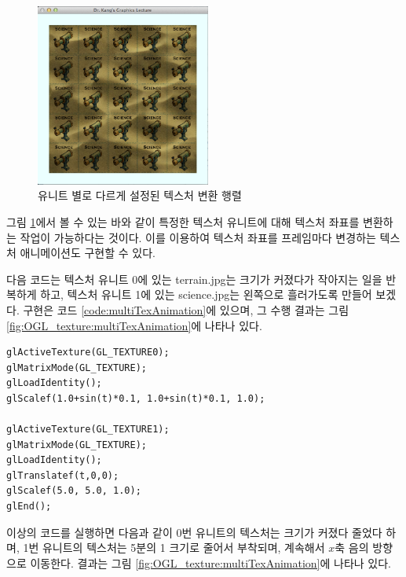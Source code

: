 \begin{figure}[h!]
    \centering
	\includegraphics[height=6cm]{OGL_texture/multiTexturedForAni.png} 
    \caption{유니트 별로 다르게 설정된 텍스처 변환 행렬}
    \label{fig:OGL_texture:multiTexturedForAni}
\end{figure}

그림 \ref{fig:OGL_texture:multiTexturedForAni}에서 볼 수 있는 바와 같이 특정한 텍스처 유니트에 대해 텍스처 좌표를 변환하는 작업이 가능하다는 것이다. 이를 이용하여 텍스처 좌표를 프레임마다 변경하는 텍스처 애니메이션도 구현할 수 있다.


다음 코드는 텍스처 유니트 0에 있는 {\sf terrain.jpg}는 크기가 커졌다가 작아지는 일을 반복하게 하고, 
텍스처 유니트 1에 있는 {\sf science.jpg}는 왼쪽으로 흘러가도록 만들어 보겠다.
구현은 코드 \ref{code:multiTexAnimation}에 있으며,
그 수행 결과는 그림 \ref{fig:OGL_texture:multiTexAnimation}에 나타나 있다.

\begin{algorithmbis}\label{code:multiTexAnimation}
\lstset{language=C++} 
\begin{lstlisting}
glActiveTexture(GL_TEXTURE0);
glMatrixMode(GL_TEXTURE);
glLoadIdentity();
glScalef(1.0+sin(t)*0.1, 1.0+sin(t)*0.1, 1.0);
	
glActiveTexture(GL_TEXTURE1);
glMatrixMode(GL_TEXTURE);
glLoadIdentity();
glTranslatef(t,0,0);
glScalef(5.0, 5.0, 1.0);
glEnd();
\end{lstlisting}
\end{algorithmbis}

이상의 코드를 실행하면 다음과 같이 0번 유니트의 텍스처는 크기가 커졌다 줄었다 하며, 
1번 유니트의 텍스처는  5분의 1 크기로 줄어서 부착되며, 계속해서 $x$축 음의 방향으로 이동한다.
결과는 그림 \ref{fig:OGL_texture:multiTexAnimation}에 나타나 있다.

